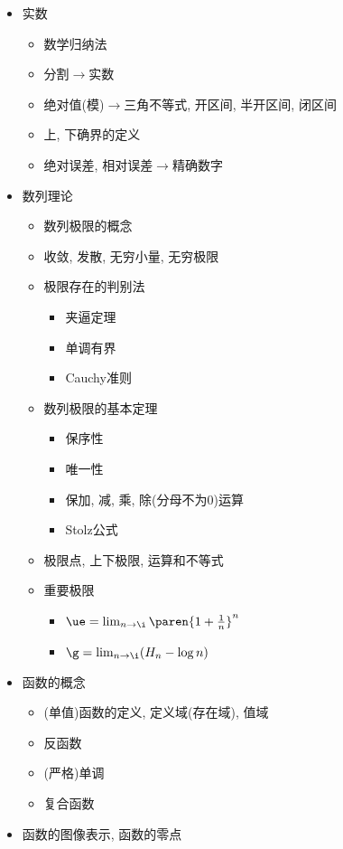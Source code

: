 \begin{itemize}
 \item 实数
 \begin{itemize}
  \item 数学归纳法
  \item 分割$\rightarrow$实数
  \item 绝对值(模)$\rightarrow$三角不等式, 开区间, 半开区间, 闭区间
  \item 上, 下确界的定义
  \item 绝对误差, 相对误差$\rightarrow$精确数字
 \end{itemize}
 \item 数列理论
 \begin{itemize}
  \item 数列极限的概念
  \item 收敛, 发散, 无穷小量, 无穷极限
  \item 极限存在的判别法
  \begin{itemize}
   \item 夹逼定理
   \item 单调有界
   \item Cauchy准则
  \end{itemize}
  \item 数列极限的基本定理
  \begin{itemize}
   \item 保序性
   \item 唯一性
   \item 保加, 减, 乘, 除(分母不为$0$)运算
   \item Stolz公式
  \end{itemize}
  \item 极限点, 上下极限, 运算和不等式
  \item 重要极限
  \begin{itemize}
   \item $\ue=\lim_{n\to\i}\paren{1+\frac1n}^n$
   \item $\g=\lim_{n\to\i}(H_n-\log n)$
  \end{itemize}
 \end{itemize}
 \item 函数的概念
 \begin{itemize}
  \item (单值)函数的定义, 定义域(存在域), 值域
  \item 反函数
  \item (严格)单调
  \item 复合函数
 \end{itemize}
 \item 函数的图像表示, 函数的零点

\end{itemize}

